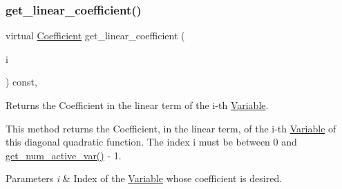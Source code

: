 \mbox{\label{class_s_m_spp__di__unipi__it_1_1_d_quad_function_a5891b5f43e335816627f514ef98f466d}} 
\subsubsection{\texorpdfstring{get\+\_\+linear\+\_\+coefficient()}{get\_linear\_coefficient()}}
{\footnotesize\ttfamily virtual \mbox{\hyperlink{class_s_m_spp__di__unipi__it_1_1_d_quad_function_a1fa0f848dbb8d52dc62a1adfee1a1f90}{Coefficient}} get\+\_\+linear\+\_\+coefficient (\begin{DoxyParamCaption}\item[{const int}]{i }\end{DoxyParamCaption}) const\hspace{0.3cm}{\ttfamily [inline]}, {\ttfamily [virtual]}}



Returns the Coefficient in the linear term of the i-\/th \mbox{\hyperlink{class_s_m_spp__di__unipi__it_1_1_variable}{Variable}}. 

This method returns the Coefficient, in the linear term, of the i-\/th \mbox{\hyperlink{class_s_m_spp__di__unipi__it_1_1_variable}{Variable}} of this diagonal quadratic function. The index i must be between 0 and \mbox{\hyperlink{class_s_m_spp__di__unipi__it_1_1_d_quad_function_af7f92d9890df5e47c25215b99f97caef}{get\+\_\+num\+\_\+active\+\_\+var()}} -\/ 1.


\begin{DoxyParams}{Parameters}
{\em i} & Index of the \mbox{\hyperlink{class_s_m_spp__di__unipi__it_1_1_variable}{Variable}} whose coefficient is desired. \\
\hline
\end{DoxyParams}
\mbox{\label{class_s_m_spp__di__unipi__it_1_1_d_quad_function_a228a1eed4901ac03c7a51da94a9bc923}} 
